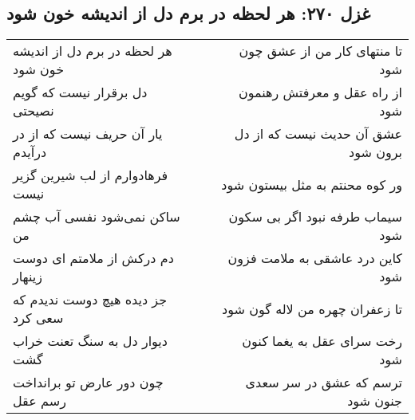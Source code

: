 \begin{center}
\section*{غزل ۲۷۰: هر لحظه در برم دل از اندیشه خون شود}
\label{sec:270}
\begin{longtable}{l p{0.5cm} r}
هر لحظه در برم دل از اندیشه خون شود
&&
تا منتهای کار من از عشق چون شود
\\
دل برقرار نیست که گویم نصیحتی
&&
از راه عقل و معرفتش رهنمون شود
\\
یار آن حریف نیست که از در درآیدم
&&
عشق آن حدیث نیست که از دل برون شود
\\
فرهادوارم از لب شیرین گزیر نیست
&&
ور کوه محنتم به مثل بیستون شود
\\
ساکن نمی‌شود نفسی آب چشم من
&&
سیماب طرفه نبود اگر بی سکون شود
\\
دم درکش از ملامتم ای دوست زینهار
&&
کاین درد عاشقی به ملامت فزون شود
\\
جز دیده هیچ دوست ندیدم که سعی کرد
&&
تا زعفران چهره من لاله گون شود
\\
دیوار دل به سنگ تعنت خراب گشت
&&
رخت سرای عقل به یغما کنون شود
\\
چون دور عارض تو برانداخت رسم عقل
&&
ترسم که عشق در سر سعدی جنون شود
\\
\end{longtable}
\end{center}
